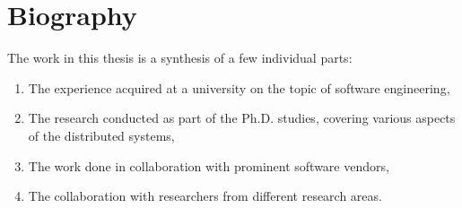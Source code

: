 \chapter*{Biography}
%
The work in this thesis is a synthesis of a few individual parts:

\begin{enumerate}[start=1,label={(\bfseries \arabic*)}]
	\item The experience acquired at a university on the topic of software engineering,
	\item The research conducted as part of the Ph.D. studies, covering various aspects of the distributed systems,
	\item The work done in collaboration with prominent software vendors,
	\item The collaboration with researchers from different research areas.
\end{enumerate}

